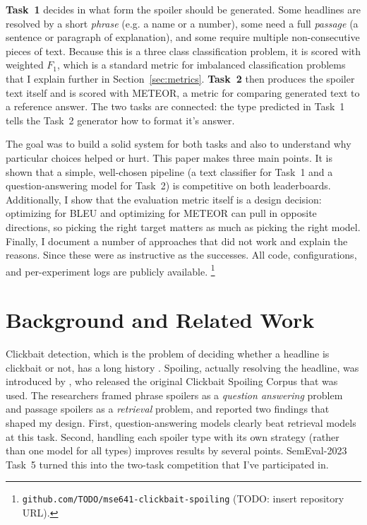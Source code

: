 \documentclass[11pt]{article}
\begin{document}
\textbf{Task~1} decides in what form the spoiler should be generated. Some headlines are resolved by a short \textit{phrase} (e.g. a name or a number), some
need a full \textit{passage} (a sentence or paragraph of explanation), and some
require multiple non-consecutive pieces of text. Because this is a three class classification problem, it is scored with
weighted $F_1$, which is a standard metric for imbalanced classification problems that I explain further
in Section~\ref{sec:metrics}. \textbf{Task~2} then produces the spoiler text
itself and is scored with METEOR, a metric for comparing generated text to a
reference answer. The two tasks are connected: the type predicted in Task~1 tells
the Task~2 generator how to format it's answer.

The goal was to build a solid system for both tasks and also to
understand why particular choices helped or hurt. This paper makes three main points. It is shown that a simple, well-chosen pipeline (a text classifier for
Task~1 and a question-answering model for Task~2) is competitive on both
leaderboards. Additionally, I show that the evaluation metric itself is a design decision:
optimizing for BLEU and optimizing for METEOR can pull in opposite directions,
so picking the right target matters as much as picking the right model. Finally,
I document a number of approaches that did not work and explain the reasons. Since these were as instructive as the successes. All code, configurations, and
per-experiment logs are publicly available.%
\footnote{\texttt{github.com/TODO/mse641-clickbait-spoiling} (TODO: insert repository URL).}

\section{Background and Related Work}
\label{sec:related}
Clickbait detection, which is the problem of deciding whether a headline is clickbait or not, has a long
history \citep{potthast2016}. Spoiling, actually resolving the headline, was
introduced by \citet{hagen2022}, who released the original Clickbait Spoiling Corpus that was used. The researchers framed phrase spoilers as a \textit{question answering}
problem and passage spoilers as a \textit{retrieval} problem, and reported two
findings that shaped my design. First, question-answering models clearly beat
retrieval models at this task. Second, handling each spoiler type with its own
strategy (rather than one model for all types) improves results by several
points. SemEval-2023 Task~5 \citep{semeval2023task5} turned this into the
two-task competition that I've participated in.
\end{document}
